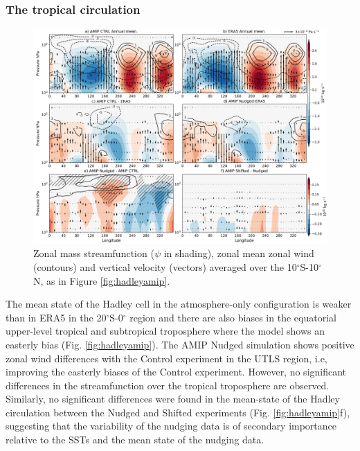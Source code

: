 \subsubsection{The tropical circulation}

\begin{figure}[t!]
\centering
 \includegraphics[width=\linewidth]{figures/suite_streamwalkerclim.png}
\caption[Walker in atmosphere-only experiments]{Zonal mass streamfunction ($\psi$ in shading), zonal mean zonal wind (contours) and vertical velocity (vectors) averaged over the 10$^\circ$S-10$^\circ$N, as in Figure \ref{fig:hadleyamip}. }
\label{fig:walkeramip}
\end{figure}

The mean state of the Hadley cell in the atmosphere-only configuration is weaker than in ERA5 in the 20$^\circ$S-0$^\circ$ region and there are also biases in the equatorial upper-level tropical and subtropical troposphere where the model shows an easterly bias (Fig. \ref{fig:hadleyamip}). 
The AMIP Nudged simulation shows  positive zonal wind differences with the Control experiment in the UTLS region, i.e, improving the easterly biases of the Control experiment. However, no significant differences in the streamfunction over the tropical troposphere are observed. Similarly, no significant differences were found in the mean-state of the Hadley circulation between the Nudged and Shifted experiments (Fig. \ref{fig:hadleyamip}f), suggesting that the variability of the nudging data is of secondary importance relative to the SSTs and the mean state of the nudging data. 

